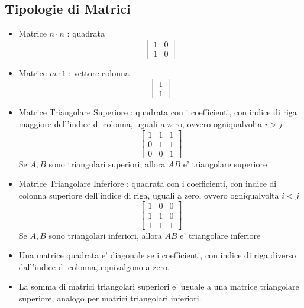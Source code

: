 \documentclass[a4paper, 10pt]{article}
\begin{document}
	\subsection{Tipologie di Matrici}
	\begin{itemize}
		\item Matrice $n \cdot n$ : quadrata 
			\[ \begin{bmatrix}
				1 & 0 \\
				1 & 0
			\end{bmatrix} 
			\]
			\item Matrice $m \cdot 1$ : vettore colonna
			\[ \begin{bmatrix}
				1 \\
				1
			\end{bmatrix} \]
			
		\item Matrice Triangolare Superiore : quadrata con i coefficienti, con indice di riga 
		maggiore dell'indice di colonna, uguali a zero, ovvero ogniqualvolta $i > j$ 
			\[ \begin{bmatrix}
				1 & 1 & 1\\
				0 & 1 & 1\\
				0 & 0 & 1
			\end{bmatrix} \]
			Se $A,B$ sono triangolari superiori, allora $AB$ e' triangolare superiore
		\item Matrice Triangolare Inferiore : quadrata con i coefficienti, con indice di colonna 
		superiore dell'indice di riga, uguali a zero, ovvero ogniqualvolta $i < j$
			\[ \begin{bmatrix}
				1 & 0 & 0\\
				1 & 1 & 0\\
				1 & 1 & 1
			\end{bmatrix} \]
			Se $A,B$ sono triangolari inferiori, allora $AB$ e' triangolare inferiore
		\item Una matrice quadrata e' diagonale se i coefficienti, con indice di riga diverso dall'indice di
		colonna, 
		      equivalgono a zero.
		\item La somma di matrici triangolari superiori e' uguale a una matrice triangolare superiore, 
		      analogo per matrici triangolari inferiori.
	\end{itemize}
	
\end{document}
